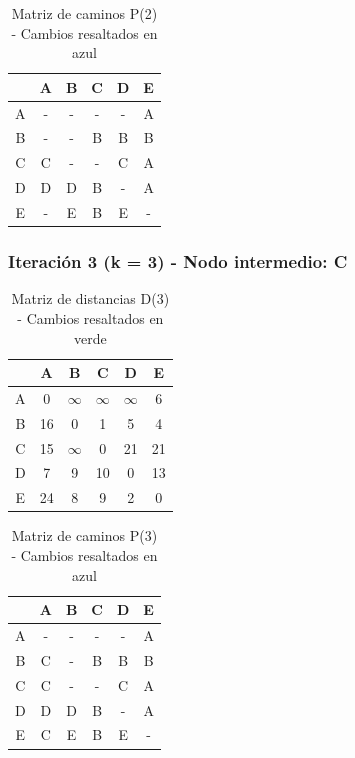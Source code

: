 \documentclass[12pt]{article}
\begin{document}
\begin{table}[h!]
\centering
\begin{tabular}{|c|c|c|c|c|c|}
\hline
 & A & B & C & D & E \\\hline
A & - & - & - & - & A \\\hline
B & - & - & B & B & B \\\hline
C & C & - & - & C & A \\\hline
D & D & D & \cellcolor{lightblue} B & - & A \\\hline
E & - & E & \cellcolor{lightblue} B & E & - \\\hline
\end{tabular}
\caption{Matriz de caminos P(2) - Cambios resaltados en azul}
\end{table}

\subsubsection{Iteración 3 (k = 3) - Nodo intermedio: C}
\begin{table}[h!]
\centering
\begin{tabular}{|c|c|c|c|c|c|}
\hline
 & A & B & C & D & E \\\hline
A & 0 & $\infty$ & $\infty$ & $\infty$ & 6 \\\hline
B & \cellcolor{lightgreen} 16 & 0 & 1 & 5 & 4 \\\hline
C & 15 & $\infty$ & 0 & 21 & 21 \\\hline
D & 7 & 9 & 10 & 0 & 13 \\\hline
E & \cellcolor{lightgreen} 24 & 8 & 9 & 2 & 0 \\\hline
\end{tabular}
\caption{Matriz de distancias D(3) - Cambios resaltados en verde}
\end{table}

\begin{table}[h!]
\centering
\begin{tabular}{|c|c|c|c|c|c|}
\hline
 & A & B & C & D & E \\\hline
A & - & - & - & - & A \\\hline
B & \cellcolor{lightblue} C & - & B & B & B \\\hline
C & C & - & - & C & A \\\hline
D & D & D & B & - & A \\\hline
E & \cellcolor{lightblue} C & E & B & E & - \\\hline
\end{tabular}
\caption{Matriz de caminos P(3) - Cambios resaltados en azul}
\end{table}
\end{document}
